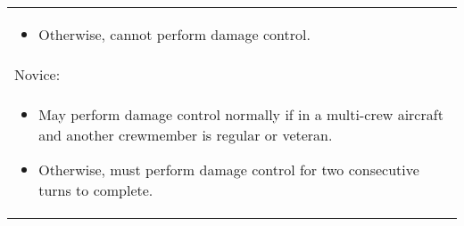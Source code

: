 \begin{onecolumntable}
{\begin{tabularx}{\linewidth}{P}
\begin{itemize}
\item Otherwise, cannot perform damage control.
\end{itemize}\\
Novice:\\
\begin{itemize}
\item May perform damage control normally if in a multi-crew aircraft and another crewmember is regular or veteran.
\item Otherwise, must perform damage control for two consecutive turns to complete.
\end{itemize}\\
\bottomrule
\end{tabularx}
}
\end{onecolumntable}
